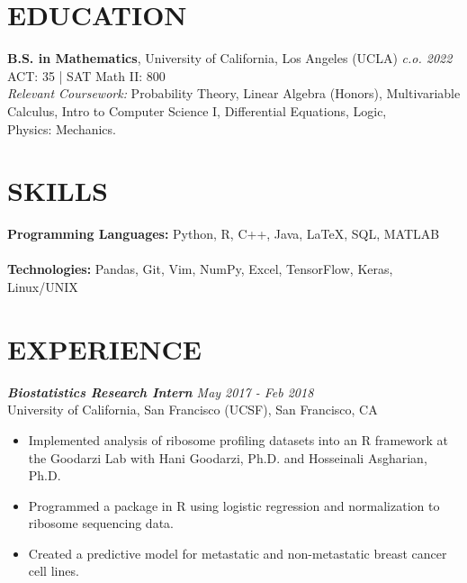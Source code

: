 \documentclass[margin, 10pt]{res} %
\begin{document}
\begin{resume}


\section{\large EDUCATION}

{\bf B.S. in Mathematics}, University of California, Los Angeles (UCLA) \hfill{\sl c.o. 2022}\\
ACT: 35 | SAT Math II: 800\\
{\sl Relevant Coursework:} Probability Theory, Linear Algebra (Honors), Multivariable Calculus, Intro to Computer Science I, Differential Equations, Logic, \\Physics: Mechanics.

\section{\large SKILLS} 

{\bf Programming Languages:} 
Python, R, C++, Java, {\LaTeX}, SQL, MATLAB \\ \\
{\bf Technologies:}
Pandas, Git, Vim, NumPy, Excel, TensorFlow, Keras, Linux/UNIX
 
\section{\large EXPERIENCE}

{\sl {\bf Biostatistics Research Intern} \hfill May 2017 - Feb 2018} \\
University of California, San Francisco (UCSF), San Francisco, CA

\begin{itemize} \itemsep -1pt %
\item Implemented analysis of ribosome profiling datasets into an R framework at the Goodarzi Lab with Hani Goodarzi, Ph.D. and Hosseinali Asgharian, Ph.D.
\item Programmed a package in R using logistic regression and normalization to ribosome sequencing data.
\item Created a predictive model for metastatic and non-metastatic breast cancer cell lines.
\end{itemize}
 

\end{resume}
\end{document}
